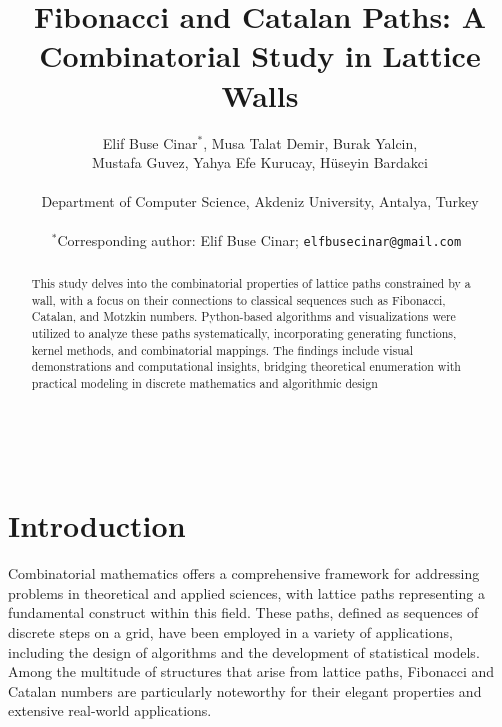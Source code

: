 \documentclass{article}
\title{Fibonacci and Catalan Paths: A Combinatorial Study in Lattice Walls}
\author{
Elif Buse Cinar$^{*}$, Musa Talat Demir, Burak Yalcin, \\ 
Mustafa Guvez, Yahya Efe Kurucay, Hüseyin Bardakci \\\\
\small Department of Computer Science, Akdeniz University, Antalya, Turkey \\\\     
\small $^{*}$Corresponding author: Elif Buse Cinar; \tt{elfbusecinar@gmail.com} 
}
\date{}
\begin{document}
\maketitle
\begin{abstract} 
\noindent      This study delves into the combinatorial properties of lattice paths constrained by a wall, with a focus on their connections to classical sequences such as Fibonacci, Catalan, and Motzkin numbers. Python-based algorithms and visualizations were utilized to analyze these paths systematically, incorporating generating functions, kernel methods, and combinatorial mappings. The findings include visual demonstrations and computational insights, bridging theoretical enumeration with practical modeling in discrete mathematics and algorithmic design \end{abstract}

\noindent{}\\

\noindent{}

 
\section{Introduction}

Combinatorial mathematics offers a comprehensive framework for addressing problems in theoretical and applied sciences, with lattice paths representing a fundamental construct within this field. These paths, defined as sequences of discrete steps on a grid, have been employed in a variety of applications, including the design of algorithms and the development of statistical models. Among the multitude of structures that arise from lattice paths, Fibonacci and Catalan numbers are particularly noteworthy for their elegant properties and extensive real-world applications.
\end{document}
